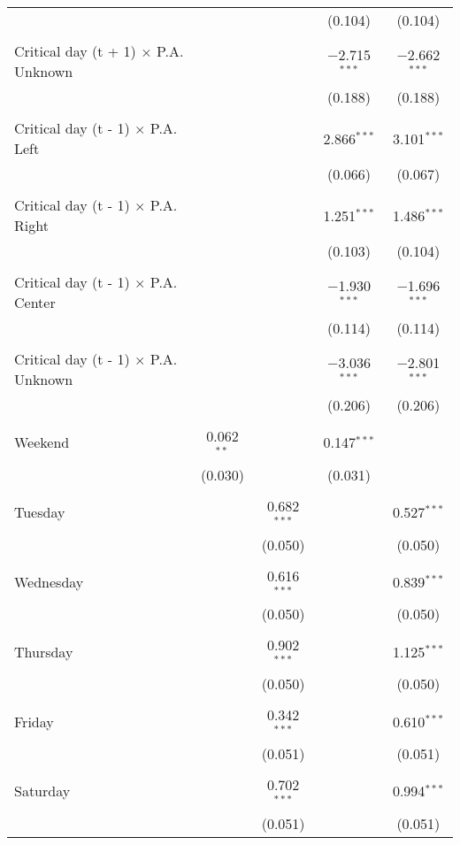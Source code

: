 \documentclass[
]{article}
\begin{document}
\begin{table}[!htbp]
{\begin{tabular}{@{\extracolsep{5pt}}lcccc}
  &  &  & (0.104) & (0.104) \\ 
  & & & & \\ 
 Critical day (t + 1) $\times$ P.A. Unknown &  &  & $-$2.715$^{***}$ & $-$2.662$^{***}$ \\ 
  &  &  & (0.188) & (0.188) \\ 
  & & & & \\ 
 Critical day (t - 1) $\times$ P.A. Left &  &  & 2.866$^{***}$ & 3.101$^{***}$ \\ 
  &  &  & (0.066) & (0.067) \\ 
  & & & & \\ 
 Critical day (t - 1) $\times$ P.A. Right &  &  & 1.251$^{***}$ & 1.486$^{***}$ \\ 
  &  &  & (0.103) & (0.104) \\ 
  & & & & \\ 
 Critical day (t - 1) $\times$ P.A. Center &  &  & $-$1.930$^{***}$ & $-$1.696$^{***}$ \\ 
  &  &  & (0.114) & (0.114) \\ 
  & & & & \\ 
 Critical day (t - 1) $\times$ P.A. Unknown &  &  & $-$3.036$^{***}$ & $-$2.801$^{***}$ \\ 
  &  &  & (0.206) & (0.206) \\ 
  & & & & \\ 
 Weekend & 0.062$^{**}$ &  & 0.147$^{***}$ &  \\ 
  & (0.030) &  & (0.031) &  \\ 
  & & & & \\ 
 Tuesday &  & 0.682$^{***}$ &  & 0.527$^{***}$ \\ 
  &  & (0.050) &  & (0.050) \\ 
  & & & & \\ 
 Wednesday &  & 0.616$^{***}$ &  & 0.839$^{***}$ \\ 
  &  & (0.050) &  & (0.050) \\ 
  & & & & \\ 
 Thursday &  & 0.902$^{***}$ &  & 1.125$^{***}$ \\ 
  &  & (0.050) &  & (0.050) \\ 
  & & & & \\ 
 Friday &  & 0.342$^{***}$ &  & 0.610$^{***}$ \\ 
  &  & (0.051) &  & (0.051) \\ 
  & & & & \\ 
 Saturday &  & 0.702$^{***}$ &  & 0.994$^{***}$ \\ 
  &  & (0.051) &  & (0.051) \\ 

\end{tabular}}
\end{table}
\end{document}
